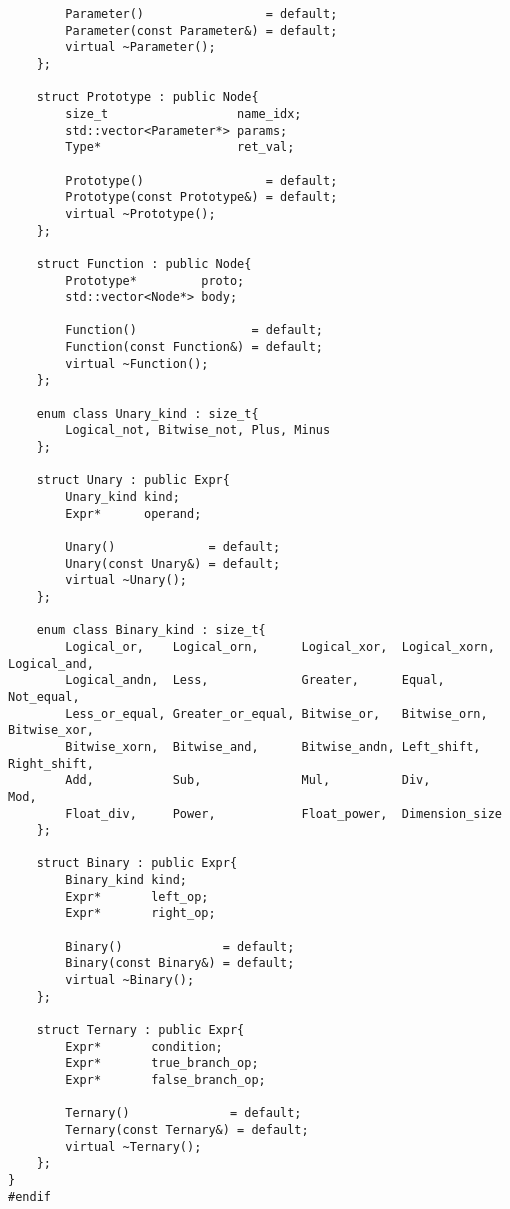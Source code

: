 \documentclass[10pt]{article}
\begin{document}
\begin{verbatim}
        Parameter()                 = default;
        Parameter(const Parameter&) = default;
        virtual ~Parameter();
    };
    
    struct Prototype : public Node{
        size_t                  name_idx;
        std::vector<Parameter*> params;
        Type*                   ret_val;
        
        Prototype()                 = default;
        Prototype(const Prototype&) = default;
        virtual ~Prototype();
    };
    
    struct Function : public Node{
        Prototype*         proto;
        std::vector<Node*> body;
        
        Function()                = default;
        Function(const Function&) = default;
        virtual ~Function();
    };
    
    enum class Unary_kind : size_t{
        Logical_not, Bitwise_not, Plus, Minus
    };
    
    struct Unary : public Expr{
        Unary_kind kind;
        Expr*      operand;    
        
        Unary()             = default;
        Unary(const Unary&) = default;
        virtual ~Unary();
    };
    
    enum class Binary_kind : size_t{
        Logical_or,    Logical_orn,      Logical_xor,  Logical_xorn,  Logical_and,   
        Logical_andn,  Less,             Greater,      Equal,         Not_equal,    
        Less_or_equal, Greater_or_equal, Bitwise_or,   Bitwise_orn,   Bitwise_xor,
        Bitwise_xorn,  Bitwise_and,      Bitwise_andn, Left_shift,    Right_shift,
        Add,           Sub,              Mul,          Div,           Mod,
        Float_div,     Power,            Float_power,  Dimension_size
    };
    
    struct Binary : public Expr{
        Binary_kind kind;
        Expr*       left_op;    
        Expr*       right_op;
        
        Binary()              = default;
        Binary(const Binary&) = default;
        virtual ~Binary();
    };
    
    struct Ternary : public Expr{
        Expr*       condition;
        Expr*       true_branch_op;    
        Expr*       false_branch_op;
        
        Ternary()              = default;
        Ternary(const Ternary&) = default;
        virtual ~Ternary();
    };
}
#endif
\end{verbatim}
\end{document}
